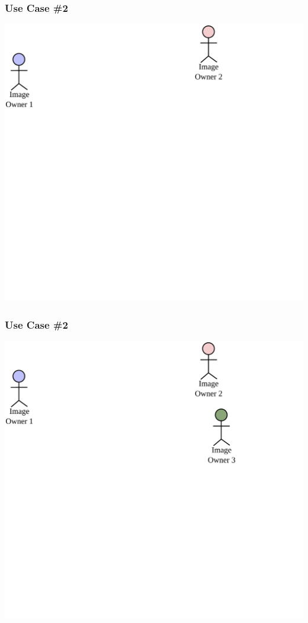 \documentclass[mathserif,xcolor=dvipsnames,hyperref={bookmarks=true}]{beamer}
\begin{document}
    \begin{frame}[t]
        \frametitle{Use Case \#2}
        \begin{center}
            \includegraphics[width=0.9\textheight]{../resources/usecases/usecase2/usecase2-step02.pdf}
        \end{center}
    \end{frame}
    \begin{frame}[t]
        \frametitle{Use Case \#2}
        \begin{center}
            \includegraphics[width=0.9\textheight]{../resources/usecases/usecase2/usecase2-step03.pdf}
        \end{center}
    \end{frame}
\end{document}
